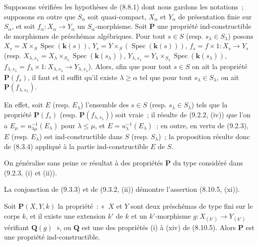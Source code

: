\begin{proposition}[9.3.3]
\label{IV.9.3.3-fr}
Supposons vérifiées les hypothèses de \textup{(8.8.1)} dont nous gardons les
notations~; supposons en outre que $S_\alpha$ soit quasi-compact, $X_\alpha$
et $Y_\alpha$ de présentation finie sur $S_\alpha$, et soit
$f_\alpha:X_\alpha\to Y_\alpha$ un $S_\alpha$-morphisme. Soit $\boldsymbol{P}$ une
propriété ind-constructible de morphismes de préschémas algébriques. Pour tout
$s\in S$ \textup{(resp.} $s_\lambda\in S_\lambda$\textup{)} posons
$X_s=X\times_S\operatorname{Spec}(\boldsymbol{k}(s))$,
$Y_s=Y\times_S(\operatorname{Spec}(\boldsymbol{k}(s)))$,
$f_s=f\times1:X_s\to Y_s$ \textup{(resp.}
$X_{\lambda,s_\lambda}=X_\lambda\times_{S_\lambda}
\operatorname{Spec}(\boldsymbol{k}(s_\lambda))$,
$Y_{\lambda,s_\lambda}=Y_\lambda\times_{S_\lambda}
\operatorname{Spec}(\boldsymbol{k}(s_\lambda))$,
$f_{\lambda,s_\lambda}=f_\lambda\times1:
X_{\lambda,s_\lambda}\to Y_{\lambda,s_\lambda}$\textup{)}. Alors, afin que pour
tout $s\in S$ on ait la propriété $\boldsymbol{P}(f_s)$, il faut et il suffit
qu'il existe $\lambda\geqslant\alpha$ tel que pour tout
$s_\lambda\in S_\lambda$, on ait $\boldsymbol{P}(f_{\lambda,s_\lambda})$.
\end{proposition}

En effet, soit $E$ (resp. $E_\lambda$) l'ensemble des $s\in S$ (resp.
$s_\lambda\in S_\lambda$) tels que la propriété $\boldsymbol{P}(f_s)$ (resp.
$\boldsymbol{P}(f_{\lambda,s_\lambda})$) soit vraie~; il résulte de
(9.2.2, (iv)) que l'on a
$E_\mu=u_{\lambda\mu}^{-1}(E_\lambda)$ pour $\lambda\leqslant\mu$, et
$E=u_\lambda^{-1}(E_\lambda)$~; en outre, en vertu de (9.2.3), $E$ (resp.
$E_\lambda$) est ind-constructible dans $S$ (resp. $S_\lambda$)~; la
proposition résulte donc de (8.3.4) appliqué à la partie ind-constructible
$E$ de $S$.

On généralise sans peine ce résultat à des propriétés $\boldsymbol{P}$ du type
considéré dans (9.2.3, (i) et (ii)).

\begin{remark}[9.3.4]
\label{IV.9.3.4-fr}
La conjonction de (9.3.3) et de (9.3.2, (ii)) démontre l'assertion
(8.10.5, (xi)).
\end{remark}

\begin{proposition}[9.3.5]
\label{IV.9.3.5-fr}
Soit $\boldsymbol{P}(X,Y,k)$ la propriété~: «~$X$ et $Y$ sont deux préschémas de
type fini sur le corps $k$, et il existe une extension $k'$ de $k$ et un
$k'$-morphisme $g:X_{(k')}\to Y_{(k')}$ vérifiant $\boldsymbol{Q}(g)$~», ou
$\boldsymbol{Q}$ est une des propriétés \textup{(i)} à \textup{(xiv)} de \textup{(8.10.5)}. Alors $\boldsymbol{P}$
est une propriété ind-constructible.
\end{proposition}

